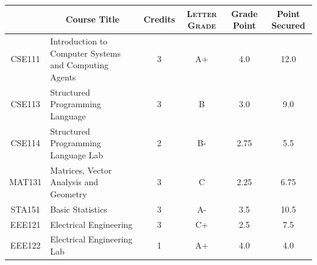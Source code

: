 \documentclass[11pt]{article}
\newcommand*{\numtwo}[1]{\pgfmathprintnumber[
                    fixed, precision=2, fixed zerofill=true]{#1}}
\begin{document}
                \begin{center}
                    \renewcommand{\arraystretch}{1.08}
                    
                \begin{tabular}{|c|l|c|>{\scshape}c|c|c|}
                \hline  \rule[-1ex]{0pt}{3.5ex} {\centering{\bf Course Code}} &  \multicolumn{1}{c|}{\textbf{Course Title}}  & {\bf Credits} & {\bf Letter Grade} & {\bf Grade Point} & {\bf Point Secured}  \\ 
                \hline   CSE111 &  Introduction to Computer Systems and Computing Agents		 & 3 & A+ & 4.0 & 12.0 \\ %
                \hline   CSE113 &  Structured Programming Language		 & 3 & B & 3.0 & 9.0 \\ %
                \hline   CSE114 &  Structured Programming Language Lab		 & 2 & B- & 2.75 & 5.5 \\ %
                \hline   MAT131 &  Matrices, Vector Analysis and Geometry		 & 3 & C & 2.25 & 6.75 \\ %
                \hline   STA151 &  Basic Statistics		 & 3 & A- & 3.5 & 10.5 \\ %
                \hline   EEE121 &  Electrical Engineering		 & 3 & C+ & 2.5 & 7.5 \\ %
                \hline   EEE122 &  Electrical Engineering Lab		 & 1 & A+ & 4.0 & 4.0 \\ %

\hline                %
                \end{tabular}
                \end{center}
                \renewcommand{\arraystretch}{1.03}
\end{document}
